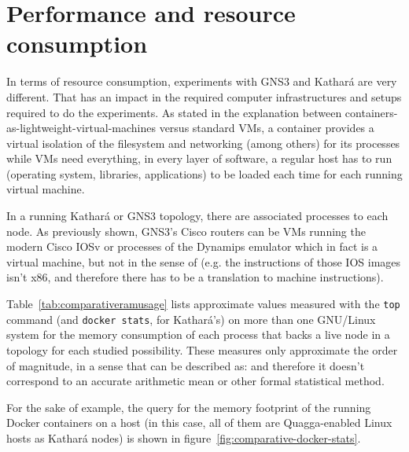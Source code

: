 \section{Performance and resource consumption}
\label{sec:comparativeperformance}

In terms of resource consumption, experiments with GNS3 and Kathará are very different.
That has an impact in the required computer infrastructures and setups required to do the experiments.
As stated in the explanation between containers-as-lightweight-virtual-machines versus standard VMs, a container provides a virtual isolation of the filesystem and networking (among others) for its processes while VMs need everything, in every layer of software, a regular host has to run (operating system, libraries, applications) to be loaded each time for each running virtual machine.

In a running Kathará or GNS3 topology, there are associated processes to each node.
As previously shown, GNS3's Cisco routers can be VMs running the modern Cisco IOSv or processes of the Dynamips emulator which in fact is a virtual machine, but not in the sense of  (e.g. the instructions of those IOS images isn't x86, and therefore there has to be a translation to machine instructions).

Table~\ref{tab:comparativeramusage} lists approximate values measured with the \texttt{top} command (and \texttt{docker~stats}, for Kathará's) on more than one GNU/Linux system for the memory consumption of each process that backs a live node in a topology for each studied possibility.
These measures only approximate the order of magnitude, in a sense that can be described as:  and therefore it doesn't correspond to an accurate arithmetic mean or other formal statistical method.



For the sake of example, the query for the memory footprint of the running Docker containers on a host (in this case, all of them are Quagga-enabled Linux hosts as Kathará nodes) is shown in figure~\ref{fig:comparative-docker-stats}.



